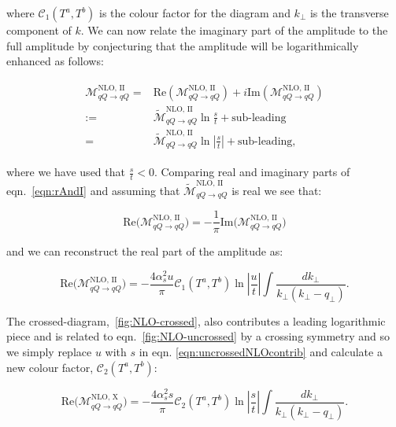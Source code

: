 		where $\mathcal{C}_1(T^a,T^b)$ is the colour factor for the diagram and $k_{\perp}$ is the transverse
		component of $k$.  We can now relate the imaginary part of the amplitude to the full amplitude by
		conjecturing that the amplitude will be logarithmically enhanced as follows:

		\begin{align}
		\begin{split}
			\mathcal{M}_{qQ\rightarrow qQ}^{\text{NLO, II}} = &\text{Re}(\mathcal{M}_{qQ\rightarrow qQ}^{\text{NLO, II}}) +
			i\text{Im}(\mathcal{M}_{qQ\rightarrow qQ}^{\text{NLO, II}})\\
			:=&\widetilde{\mathcal{M}}_{qQ\rightarrow qQ}^{\text{NLO, II}}\ln\frac{s}{t} + \text{sub-leading}\\
			=&\widetilde{\mathcal{M}}_{qQ\rightarrow qQ}^{\text{NLO, II}}\ln\left|\frac{s}{t}\right| + \text{sub-leading},
			\label{eqn:rAndI}
		\end{split}
		\end{align}

		where we have used that $\frac{s}{t} < 0$.  Comparing real and imaginary parts of eqn.~\eqref{eqn:rAndI} and assuming
		that $\widetilde{\mathcal{M}}_{qQ\rightarrow qQ}^{\text{NLO, II}}$ is real we see that:

		\begin{equation}
			\text{Re}\Big(\mathcal{M}_{qQ\rightarrow qQ}^{\text{NLO, II}}\Big) = -\frac{1}{\pi}\text{Im}\Big(\mathcal{M}_{qQ\rightarrow qQ}^{\text{NLO, II}}\Big)
		\end{equation}

		and we can reconstruct the real part of the amplitude as:

		\begin{equation}
			\text{Re}\Big(\mathcal{M}_{qQ\rightarrow qQ}^{\text{NLO, II}}\Big) = -\frac{4\alpha_s^2u}{\pi} \mathcal{C}_1(T^a,T^b)
			\ln\left|\frac{u}{t}\right|\int \frac{dk_{\perp}}{k_{\perp}(k_{\perp} - q_{\perp})}.
			\label{eqn:uncrossedNLOcontrib}
		\end{equation}

		The crossed-diagram,~\eqref{fig:NLO-crossed}, also contributes a leading logarithmic piece and is related to
		eqn.~\eqref{fig:NLO-uncrossed} by a crossing symmetry and so we simply replace $u$ with $s$ in eqn.
		\eqref{eqn:uncrossedNLOcontrib} and calculate a new colour factor, $\mathcal{C}_2(T^a,T^b)$:

		\begin{equation}
			\text{Re}\Big(\mathcal{M}_{qQ\rightarrow qQ}^{\text{NLO, X}}\Big) = -\frac{4\alpha_s^2s}{\pi} \mathcal{C}_2(T^a,T^b)
			\ln\left|\frac{s}{t}\right| \int \frac{dk_{\perp}}{k_{\perp}(k_{\perp} - q_{\perp})}.
			\label{eqn:crossedNLOcontrib}
		\end{equation}

